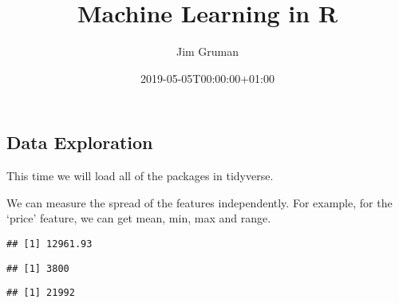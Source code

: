 \documentclass[]{article}
\title{Machine Learning in R}
\author{Jim Gruman}
\date{2019-05-05T00:00:00+01:00}
\newenvironment{Shaded}{\begin{snugshade}}{\end{snugshade}}
\newcommand{\KeywordTok}[1]{\textcolor[rgb]{0.13,0.29,0.53}{\textbf{#1}}}
\newcommand{\NormalTok}[1]{#1}
\newcommand{\OperatorTok}[1]{\textcolor[rgb]{0.81,0.36,0.00}{\textbf{#1}}}
\newcommand{\StringTok}[1]{\textcolor[rgb]{0.31,0.60,0.02}{#1}}
\begin{document}
\maketitle

{
\setcounter{tocdepth}{3}
\tableofcontents
}
\hypertarget{data-exploration}{%
\subsection{Data Exploration}\label{data-exploration}}

This time we will load all of the packages in {tidyverse}.

We can measure the spread of the features independently. For example,
for the `price' feature, we can get mean, min, max and range.

\begin{Shaded}
\end{Shaded}

\begin{verbatim}
## [1] 12961.93
\end{verbatim}

\begin{Shaded}
\end{Shaded}

\begin{verbatim}
## [1] 3800
\end{verbatim}

\begin{Shaded}
\end{Shaded}

\begin{verbatim}
## [1] 21992
\end{verbatim}

\begin{Shaded}
\end{Shaded}
\end{document}
